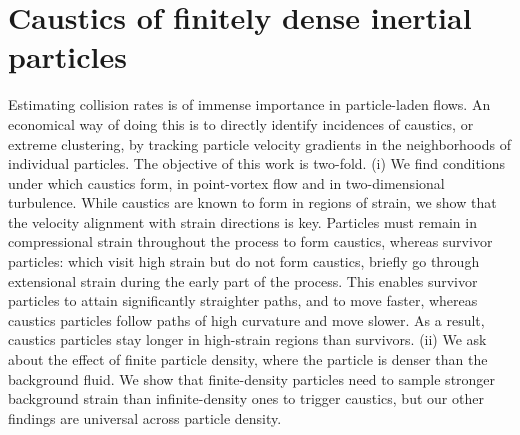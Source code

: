 \documentclass[../Rajarshi-thesis-draft.tex]{subfiles}
\begin{document}
\chapter{Caustics of finitely dense inertial particles}\label{fn-cstcs}


\newcommand{\rga}[1]{\textcolor{blue}{{[\textbf{#1}]}}}
\providecommand{\mathdefault}[1]{#1}
\newcommand{\es}{A~}
\DeclareRobustCommand{\eneg}{\vec{e}_{-}}
\DeclareRobustCommand{\epos}{\vec{e}_+}

\begin{summary}
Estimating collision rates is of immense importance in particle-laden flows. An economical way of doing this is to directly identify incidences of caustics, or extreme clustering, by tracking particle velocity gradients in the neighborhoods of individual particles. The objective of this work is two-fold. (i) We find conditions under which caustics form, in point-vortex flow and in two-dimensional turbulence. While caustics are known to form in regions of strain, we show that the {velocity alignment with strain directions} is key. Particles must remain in compressional strain throughout the process to form caustics, whereas survivor particles: which visit high strain but do not form caustics, briefly go through extensional strain during the early part of the process. This enables survivor particles to attain significantly straighter paths, and to move faster, whereas caustics particles follow paths of high curvature and move slower. As a result, caustics particles stay longer in high-strain regions than survivors. (ii) We ask about the effect of finite particle density, where the particle is denser than the background fluid. We show that finite-density particles need to sample stronger background strain than infinite-density ones to trigger caustics, but our other findings are universal across particle density.
\end{summary}
\end{document}
